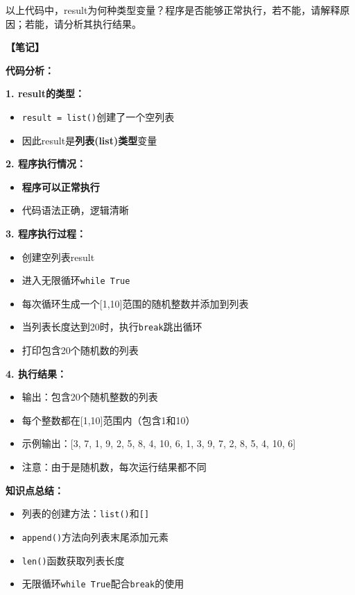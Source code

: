 以上代码中，result为何种类型变量？程序是否能够正常执行，若不能，请解释原因；若能，请分析其执行结果。

\begin{mdframed}[linewidth=1pt, linecolor=black]

  \textbf{\color{red}【笔记】}

  \textbf{代码分析：}

  \textbf{1. result的类型：}
  \begin{itemize}
    \item \texttt{result = list()}创建了一个空列表
    \item 因此result是\textbf{列表(list)类型}变量
  \end{itemize}

  \textbf{2. 程序执行情况：}
  \begin{itemize}
    \item \textbf{程序可以正常执行}
    \item 代码语法正确，逻辑清晰
  \end{itemize}

  \textbf{3. 程序执行过程：}
  \begin{itemize}
    \item 创建空列表result
    \item 进入无限循环\texttt{while True}
    \item 每次循环生成一个[1,10]范围的随机整数并添加到列表
    \item 当列表长度达到20时，执行\texttt{break}跳出循环
    \item 打印包含20个随机数的列表
  \end{itemize}

  \textbf{4. 执行结果：}
  \begin{itemize}
    \item 输出：包含20个随机整数的列表
    \item 每个整数都在[1,10]范围内（包含1和10）
    \item 示例输出：[3, 7, 1, 9, 2, 5, 8, 4, 10, 6, 1, 3, 9, 7, 2, 8, 5, 4, 10, 6]
    \item 注意：由于是随机数，每次运行结果都不同
  \end{itemize}

  \textbf{知识点总结：}
  \begin{itemize}
    \item 列表的创建方法：\texttt{list()}和\texttt{[]}
    \item \texttt{append()}方法向列表末尾添加元素
    \item \texttt{len()}函数获取列表长度
    \item 无限循环\texttt{while True}配合\texttt{break}的使用
  \end{itemize}

\end{mdframed}

